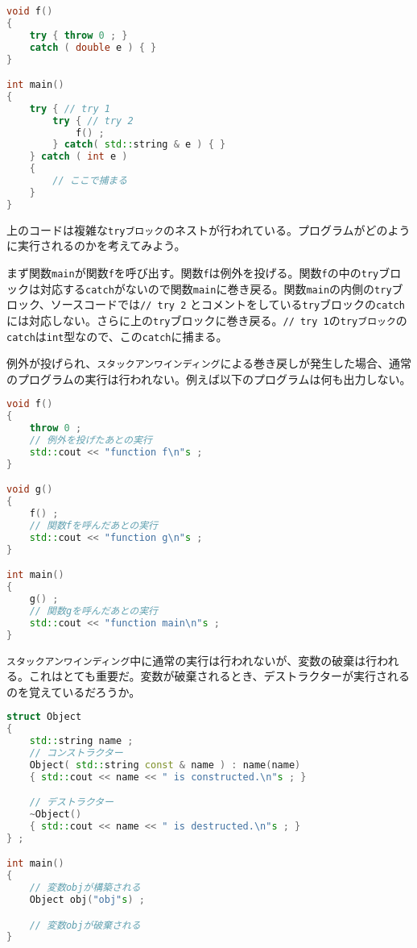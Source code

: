 \begin{lstlisting}[language={C++}]
void f()
{
    try { throw 0 ; }
    catch ( double e ) { }
}

int main()
{
    try { // try 1
        try { // try 2
            f() ;
        } catch( std::string & e ) { }
    } catch ( int e )
    {
        // ここで捕まる
    }
}
\end{lstlisting}

上のコードは複雑な\texttt{tryブロック}のネストが行われている。プログラムがどのように実行されるのかを考えてみよう。

まず関数\texttt{main}が関数\texttt{f}を呼び出す。関数\texttt{f}は例外を投げる。関数\texttt{f}の中の\texttt{try}ブロックは対応する\texttt{catch}がないので関数\texttt{main}に巻き戻る。関数\texttt{main}の内側の\texttt{try}ブロック、ソースコードでは\texttt{//{\nobreak} try 2} とコメントをしている\texttt{try}ブロックの\texttt{catch}には対応しない。さらに上の\texttt{try}ブロックに巻き戻る。\texttt{// try 1}の\texttt{tryブロック}の\texttt{catch}は\texttt{int}型なので、この\texttt{catch}に捕まる。

例外が投げられ、\texttt{スタックアンワインディング}による巻き戻しが発生した場合、通常のプログラムの実行は行われない。例えば以下のプログラムは何も出力しない。

\begin{lstlisting}[language={C++}]
void f()
{
    throw 0 ;
    // 例外を投げたあとの実行
    std::cout << "function f\n"s ;
}

void g()
{
    f() ;
    // 関数fを呼んだあとの実行
    std::cout << "function g\n"s ;
}

int main()
{
    g() ;
    // 関数gを呼んだあとの実行
    std::cout << "function main\n"s ;
}
\end{lstlisting}

\texttt{スタックアンワインディング}中に通常の実行は行われないが、変数の破棄は行われる。これはとても重要だ。変数が破棄されるとき、デストラクターが実行されるのを覚えているだろうか。

\begin{lstlisting}[language={C++}]
struct Object
{
    std::string name ;
    // コンストラクター
    Object( std::string const & name ) : name(name) 
    { std::cout << name << " is constructed.\n"s ; }

    // デストラクター
    ~Object()
    { std::cout << name << " is destructed.\n"s ; }
} ;

int main()
{
    // 変数objが構築される
    Object obj("obj"s) ;

    // 変数objが破棄される
}
\end{lstlisting}

